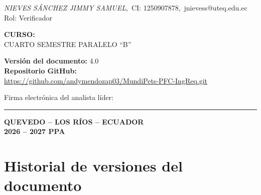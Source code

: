 \documentclass[journal,onecolumn]{IEEEtran}
\begin{document}
\begin{titlepage}
		\textit{NIEVES SÁNCHEZ JIMMY SAMUEL},~CI: 1250907878,~jnievess@uteq.edu.ec\\
		{\small Rol: Verificador}
		
		\vspace{0.2cm}
		
		{\normalsize\bfseries CURSO:}\\[4pt]
		{\normalsize CUARTO SEMESTRE PARALELO \enquote{B}}
		
		\vspace{0.2cm}
		
		{\normalsize\bfseries Versión del documento:} 4.0\\[4pt]
		\textbf{Repositorio GitHub:}\\
		\url{https://github.com/andymendozap03/MundiPets-PFC-IngReq.git}
		
		
		\vspace{1.8cm}
		
		{\small Firma electrónica del analista líder: \rule{5cm}{0.4pt}}
		
		{\normalsize\bfseries QUEVEDO -- LOS RÍOS -- ECUADOR}\\[4pt]
		{\normalsize\bfseries 2026 -- 2027 PPA}
		
	\end{titlepage}
	
	\section*{Historial de versiones del documento}
	
\end{document}
